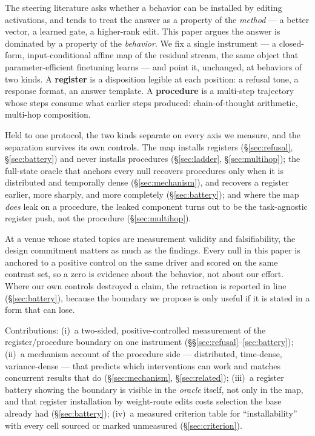 \documentclass{article}
\begin{document}
The steering literature asks whether a behavior can be installed by editing activations, and tends
to treat the answer as a property of the \emph{method} --- a better vector, a learned gate, a
higher-rank edit. This paper argues the answer is dominated by a property of the \emph{behavior}.
We fix a single instrument --- a closed-form, input-conditional affine map of the residual stream,
the same object that parameter-efficient finetuning learns --- and point it, unchanged, at behaviors
of two kinds. A \textbf{register} is a disposition legible at each position: a refusal tone, a
response format, an answer template. A \textbf{procedure} is a multi-step trajectory whose steps
consume what earlier steps produced: chain-of-thought arithmetic, multi-hop composition.

Held to one protocol, the two kinds separate on every axis we measure, and the separation survives
its own controls. The map installs registers (\S\ref{sec:refusal}, \S\ref{sec:battery}) and never
installs procedures (\S\ref{sec:ladder}, \S\ref{sec:multihop}); the full-state oracle that anchors
every null recovers procedures only when it is distributed and temporally dense
(\S\ref{sec:mechanism}), and recovers a register earlier, more sharply, and more completely
(\S\ref{sec:battery}); and where the map \emph{does} leak on a procedure, the leaked component
turns out to be the task-agnostic register push, not the procedure (\S\ref{sec:multihop}).

At a venue whose stated topics are measurement validity and falsifiability, the design commitment
matters as much as the findings. Every null in this paper is anchored to a positive control on the
same driver and scored on the same contrast set, so a zero is evidence about the behavior, not
about our effort. Where our own controls destroyed a claim, the retraction is reported in line
(\S\ref{sec:battery}), because the boundary we propose is only useful if it is stated in a form
that can lose.

Contributions: (i)~a two-sided, positive-controlled measurement of the register/procedure boundary
on one instrument (\S\S\ref{sec:refusal}--\ref{sec:battery}); (ii)~a mechanism account of the
procedure side --- distributed, time-dense, variance-dense --- that predicts which interventions
can work and matches concurrent results that do (\S\ref{sec:mechanism}, \S\ref{sec:related});
(iii)~a register battery showing the boundary is visible in the \emph{oracle} itself, not only in
the map, and that register installation by weight-route edits costs selection the base already had
(\S\ref{sec:battery}); (iv)~a measured criterion table for ``installability'' with every cell
sourced or marked unmeasured (\S\ref{sec:criterion}).
\end{document}

